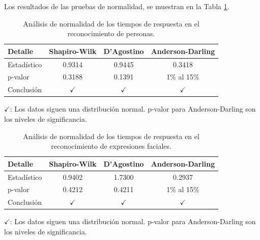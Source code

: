 \documentclass[a4paper,fleqn]{cas-sc}
\begin{document}
					Los resultados de las pruebas de normalidad, se muestran en la Tabla \ref{table:PersonsNormality}.
					
					\begin{table}[h]
						\centering
						\caption{Análisis de normalidad de los tiempos de respuesta en el reconocimiento de personas.}
						\label{table:PersonsNormality}
						\begin{tabularx}{0.6\textwidth}{Xccc}
							\toprule
							\textbf{Detalle} & \textbf{Shapiro-Wilk} & \textbf{D'Agostino} & \textbf{Anderson-Darling}\\
							\midrule
							Estadístico & 0.9314 & 0.9445 &  0.3418 \\
							p-valor & 0.3188 & 0.1391 & 1\% al 15\% \\
							Conclusión & \(\checkmark\) & \(\checkmark\) & \(\checkmark\)\\
						\end{tabularx}
						\vspace{0.3em} %
						\parbox{0.75\textwidth}{\footnotesize
							\(\checkmark\): Los datos siguen una distribución normal. p-valor para Anderson-Darling son los niveles de significancia.
						}
					\end{table}
					
					\begin{table}[h]
						\centering
						\caption{Análisis de normalidad de los tiempos de respuesta en el reconocimiento de expresiones faciales.}
						\label{FaceExpressionsNormality}
						\begin{tabularx}{0.6\textwidth}{Xccc}
							\toprule
							\textbf{Detalle} & \textbf{Shapiro-Wilk} & \textbf{D'Agostino} & \textbf{Anderson-Darling}\\
							\midrule
							Estadístico & 0.9402 & 1.7300 &  0.2937 \\
							p-valor & 0.4212 & 0.4211 & 1\% al 15\% \\
							Conclusión & \(\checkmark\) & \(\checkmark\) & \(\checkmark\)\\
						\end{tabularx}
						\vspace{0.3em} %
						\parbox{0.75\textwidth}{\footnotesize
							\(\checkmark\): Los datos siguen una distribución normal. p-valor para Anderson-Darling son los niveles de significancia.
						}
					\end{table}
					
\end{document}
